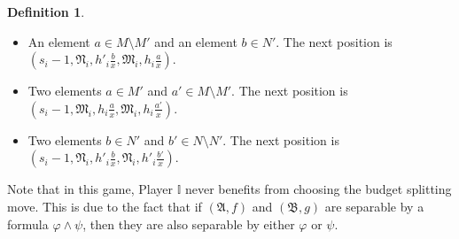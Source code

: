 \documentclass{article}
\theoremstyle{definition}
\newtheorem{definition}[theorem]{Definition}
\begin{document}
\begin{definition}
\begin{enumerate}
\begin{enumerate}
\begin{itemize}
                \item An element $a\in M\setminus M'$ and an
                element $b\in N'$. The next position is
                $(s_i-1,\mathfrak{N}_i,h'_i\frac{b}{x},
                \mathfrak{M}_i,h_i\frac{a}{x})$.
                \item Two elements $a\in M'$ and $a'\in M\setminus
                M'$. The next position is
                $(s_i-1,\mathfrak{M}_i,h_i\frac{a}{x},
                \mathfrak{M}_i,h_i\frac{a'}{x})$.
                \item Two elements $b\in N'$ and $b'\in N\setminus
                N'$. The next position is
                $(s_i-1,\mathfrak{N}_i,h'_i\frac{b}{x},
                \mathfrak{N}_i,h'_i\frac{b'}{x})$.
            \end{itemize}
        \end{enumerate}
    \end{enumerate}
\end{definition}

Note that in this game, Player $\mathbb{I}$ never benefits from choosing the budget splitting move. This is due to the fact that if $(\mathfrak{A},f)$ and $(\mathfrak{B},g)$ are separable by a formula $\varphi\land\psi$, then they are also separable by either $\varphi$ or $\psi$.
\end{document}
